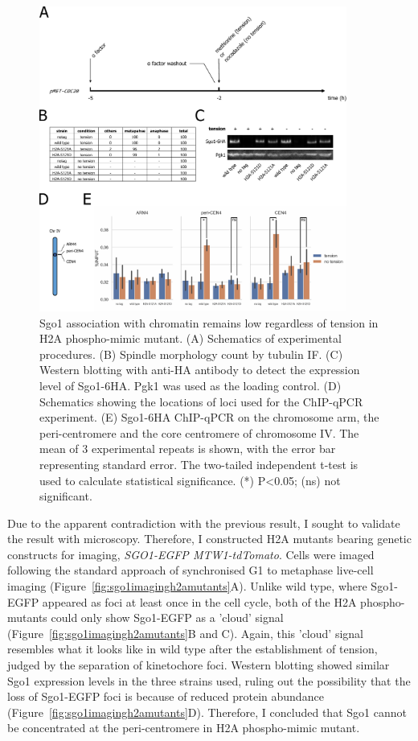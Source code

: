 \begin{figure}[htbp]
  \centering
  \includegraphics[width=0.9\textwidth]{chapter3/figures/Sgo1 in H2A mutants ChIP.pdf}
  \caption[Sgo1 association with chromatin remains low regardless of tension in H2A phospho-mimic mutant]{Sgo1 association with chromatin remains low regardless of tension in H2A phospho-mimic mutant. (A) Schematics of experimental procedures. (B) Spindle morphology count by tubulin IF. (C) Western blotting with anti-HA antibody to detect the expression level of Sgo1-6HA. Pgk1 was used as the loading control. (D) Schematics showing the locations of loci used for the ChIP-qPCR experiment. (E) Sgo1-6HA ChIP-qPCR on the chromosome arm, the peri-centromere and the core centromere of chromosome IV. The mean of 3 experimental repeats is shown, with the error bar representing standard error. The two-tailed independent t-test is used to calculate statistical significance. (*) P<0.05; (ns) not significant.}
  \label{fig:sgo1chiph2amutants}
\end{figure}

Due to the apparent contradiction with the previous result, I sought to validate the result with microscopy. Therefore, I constructed H2A mutants bearing genetic constructs for imaging, \textit{SGO1-EGFP MTW1-tdTomato}. Cells were imaged following the standard approach of synchronised G1 to metaphase live-cell imaging (Figure~\ref{fig:sgo1imagingh2amutants}A). Unlike wild type, where Sgo1-EGFP appeared as foci at least once in the cell cycle, both of the H2A phospho-mutants could only show Sgo1-EGFP as a 'cloud' signal (Figure~\ref{fig:sgo1imagingh2amutants}B and C). Again, this 'cloud' signal resembles what it looks like in wild type after the establishment of tension, judged by the separation of kinetochore foci. Western blotting showed similar Sgo1 expression levels in the three strains used, ruling out the possibility that the loss of Sgo1-EGFP foci is because of reduced protein abundance (Figure~\ref{fig:sgo1imagingh2amutants}D). Therefore, I concluded that Sgo1 cannot be concentrated at the peri-centromere in H2A phospho-mimic mutant. 

